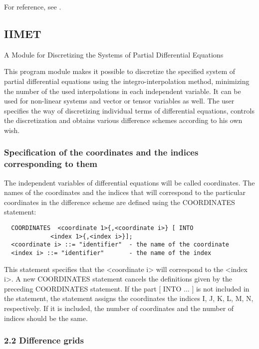 For reference, see \cite{WirthPhD1980}.




\subsection{IIMET}



                 A Module for Discretizing the Systems
                   of Partial Differential Equations



     This program module makes it possible  to discretize  the specified
system of partial differential equations using the integro-interpolation
method,  minimizing  the  number  of  the  used  interpolations  in each
independent variable.  It can  be used for non-linear systems and vector
or tensor variables as well.  The user specifies the way of discretizing
individual terms  of differential equations, controls the discretization
and obtains various difference schemes according to his own wish.


\subsubsection{Specification of the coordinates and the indices corresponding to them}

     The independent variables of differential equations  will be called
coordinates.  The  names  of  the  coordinates and the indices that will
correspond to the particular  coordinates in  the difference  scheme are
defined using the COORDINATES statement:
\begin{verbatim}
  COORDINATES  <coordinate 1>{,<coordinate i>} [ INTO
             <index 1>{,<index i>}];
  <coordinate i> ::= "identifier"  - the name of the coordinate
  <index i> ::= "identifier"       - the name of the index
\end{verbatim}
This statement  specifies that the <coordinate i> will correspond to the
<index i>. A new COORDINATES statement cancels the  definitions given by
the preceding  COORDINATES statement.  If the  part [  INTO ... ] is not
included in the statement, the  statement  assigns  the  coordinates the
indices I, J, K, L, M, N, respectively. If it is included, the number of
coordinates and the number of indices should be the same.



\subsubsection{2.2 Difference grids}


